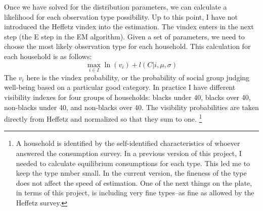 \documentclass{article}
\begin{document}
Once we have solved for the distribution parameters, we can calculate a likelihood for each observation type possibility.
Up to this point, I have not introduced the Heffetz vindex into the estimation. The vindex enters in the next step (the E step in the EM algorithm).
Given a set of parameters, we need to choose the most likely observation type for each household.
This calculation for each household is as follows:
\begin{equation}
	\max_{i\in I} \ln (v_i) + l(C|i,\mu,\sigma)
\end{equation}
The $v_i$ here is the vindex probability, or the probability of social group judging well-being based on a particular good category.
In practice I have different visibility indexes for four groups of households: blacks under 40, blacks over 40, non-blacks under 40, and non-blacks over 40.
The visibility probabilities are taken directly from Heffetz and normalized so that they sum to one.
\footnote{A household is identified by the self-identified characteristics of whoever answered the consumption survey. 
In a previous version of this project, I needed to calculate equilibrium consumptions for each type.  This led me to keep the type nmber small.  In the current version, the fineness of the type does not affect the speed of estimation.  One of the next things on the plate, in terms of this project, is including very fine types--as fine as allowed by the Heffetz survey.}
\end{document}
